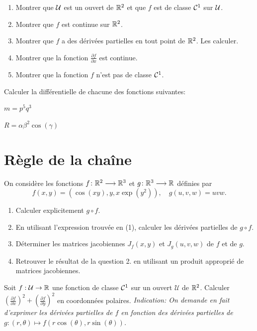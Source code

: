 \documentclass{tp_um}
\begin{document}
\begin{enumerate}
	\item Montrer que $\mathcal{U}$ est un ouvert de $\mathbb{R}^2$ et que $f$ est de classe $\mathcal{C}^{1}$ sur $\mathcal{U}$.
	\item Montrer que $f$ est continue sur $\mathbb{R}^2$.
	\item Montrer que $f$ a des dérivées partielles en tout point de $\mathbb{R}^2$. Les calculer.
	\item Montrer que la fonction $\frac{\partial f}{\partial x}$ est continue.
	\item Montrer que la fonction $f$ n'est pas de classe $\mathcal{C}^{1}$.
\end{enumerate}

\exo{} Calculer la différentielle de chacune des fonctions suivantes:

\begin{enumerate*}[itemjoin={{, \hspace*{1em} }}]
		\item $m = p^5q^3$  \   
		\item $R= \alpha \beta^2 \cos(\gamma)$  \   
	\end{enumerate*}


\section{Règle de la chaîne}

\exo{}
On consid\`ere les fonctions $f\colon \mathbb{R}^2\longrightarrow \mathbb{R}^3$ et
$g\colon \mathbb{R}^3\longrightarrow \mathbb{R}$ d\'efinies par
\[
f(x,y)=(\cos(xy), y, x\exp(y^2)),\quad 
g(u,v,w)= uvw .
\]
\begin{enumerate}
 \item  Calculer explicitement $g\circ f$.
 \item En utilisant l'expression trouv\'ee en (1), calculer les d\'eriv\'ees partielles de $g\circ f$.
 \item  D\'eterminer les matrices jacobiennes $J_f(x,y)$ et $J_g(u,v,w)$ de $f$ et de $g$. 
 \item Retrouver le r\'esultat de la question 2. en utilisant un produit appropri\'e de matrices jacobiennes. 
\end{enumerate}


\exo{} Soit $f:\mathcal U \to \mathbb{R}$ une fonction de classe $\mathcal{C}^{1}$ sur un ouvert $\mathcal U$ de $\mathbb{R}^2$. Calculer $\left( \frac{\partial f}{\partial x}  \right)^2 + \left( \frac{\partial f}{\partial y}  \right)^2 $ en coordonnées polaires.
{\it Indication:  On demande en fait d'exprimer les dérivées partielles de $f$ en fonction des dérivées partielles de  $g:(r,\theta) \mapsto f(r\cos(\theta), r \sin(\theta))$. }
\end{document}
